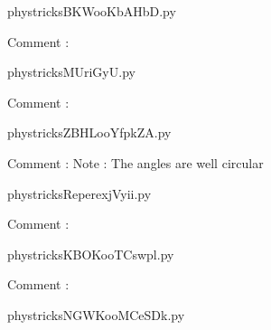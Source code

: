     \newcommand{\CaptionFigBKWooKbAHbD}{<+Type your caption here+>}
    \begin{center}
        
    \end{center}
    phystricksBKWooKbAHbD.py

    Comment : 

    \clearpage
    


    \newcommand{\CaptionFigMUriGyU}{<+Type your caption here+>}
    \begin{center}
        
    \end{center}
    phystricksMUriGyU.py

    Comment : 

    \clearpage
    


    \newcommand{\CaptionFigZBHLooYfpkZA}{<+Type your caption here+>}
    \begin{center}
        
    \end{center}
    phystricksZBHLooYfpkZA.py

    Comment : Note : The angles are well circular

    \clearpage
    


    \newcommand{\CaptionFigReperexjVyii}{<+Type your caption here+>}
    \begin{center}
        
    \end{center}
    phystricksReperexjVyii.py

    Comment : 

    \clearpage
    


    \newcommand{\CaptionFigKBOKooTCswpl}{<+Type your caption here+>}
    \begin{center}
        
    \end{center}
    phystricksKBOKooTCswpl.py

    Comment : 

    \clearpage
    


    \newcommand{\CaptionFigNGWKooMCeSDk}{<+Type your caption here+>}
    \begin{center}
        
    \end{center}
    phystricksNGWKooMCeSDk.py

